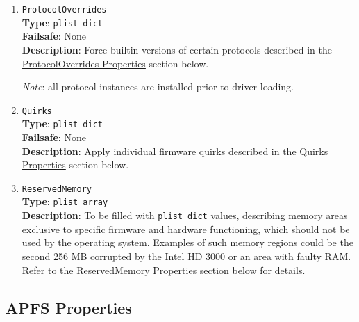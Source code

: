 \documentclass[]{article}
\begin{document}
\begin{enumerate}
\item
  \texttt{ProtocolOverrides}\\
  \textbf{Type}: \texttt{plist\ dict}\\
  \textbf{Failsafe}: None\\
  \textbf{Description}: Force builtin versions of certain protocols described
  in the \hyperref[uefiprotoprops]{ProtocolOverrides Properties} section below.

  \emph{Note}: all protocol instances are installed prior to driver loading.

\item
  \texttt{Quirks}\\
  \textbf{Type}: \texttt{plist\ dict}\\
  \textbf{Failsafe}: None\\
  \textbf{Description}: Apply individual firmware quirks described in the
  \hyperref[uefiquirkprops]{Quirks Properties} section below.

\item
  \texttt{ReservedMemory}\\
  \textbf{Type}: \texttt{plist\ array}\\
  \textbf{Description}: To be filled with \texttt{plist\ dict} values,
  describing memory areas exclusive to specific firmware and hardware functioning,
  which should not be used by the operating system. Examples of such memory regions
  could be the second 256 MB corrupted by the Intel HD 3000 or an area with faulty RAM.
  Refer to the \hyperref[uefirsvdprops]{ReservedMemory Properties} section below for details.

\end{enumerate}

\subsection{APFS Properties}\label{uefiapfsprops}
\end{document}
